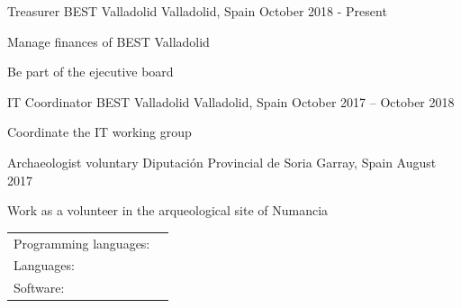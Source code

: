 \documentclass[]{awesome-cv}
\begin{document}
\vspace{-2mm}
\begin{cventries}
	\cventry
	{Treasurer}
	{BEST Valladolid}
	{Valladolid, Spain}
	{October 2018 - Present}
	{\begin{cvitems}
		\item {Manage finances of BEST Valladolid}
		\item {Be part of the ejecutive board}
		\end{cvitems}}
	\cventry
	{IT Coordinator}
	{BEST Valladolid}
	{Valladolid, Spain}
	{October 2017 – October 2018}
	{\begin{cvitems}
		\item {Coordinate the IT working group}
		\end{cvitems}}
	\cventry
	{Archaeologist voluntary}
	{Diputación Provincial de Soria}
	{Garray, Spain}
	{August 2017}
	{\begin{cvitems}
		\item {Work as a volunteer in the arqueological site of Numancia}
		\end{cvitems}}
\end{cventries}
\begin{cventries}
	\cventry
	{}
	{\def\arraystretch{1.15}{\begin{tabular}{ l l }
		Programming languages:  & {\skill{ Rust, C, Python, C\#, Java, JavaScript, TypeScript}} \\
		Languages:  & {\skill{ Spanish (native), English ( FIRST B2)}} \\
		Software: & {\skill{GNU/Linux, Windows, \LaTeX ,MySQL, PostgreSQL, MongoDB, Microsoft Office, Git, Inkscape}} \\
		\end{tabular}}}
	{}
	{}
	{}
\end{cventries}
\end{document}
